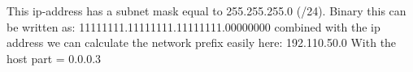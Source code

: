 This ip-address has a subnet mask equal to 255.255.255.0 (/24).
Binary this can be written as: 
11111111.11111111.11111111.00000000
combined with the ip address we can calculate the network prefix easily here:
192.110.50.0
With the host part = 0.0.0.3